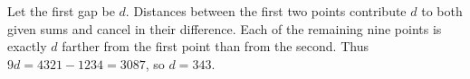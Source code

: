 Let the first gap be $d$. Distances between the first two points contribute $d$ to both given sums and cancel in their difference. Each of the remaining nine points is exactly $d$ farther from the first point than from the second. Thus $9d=4321-1234=3087$, so $\boxed{d=343}$.
